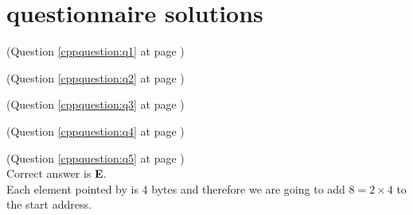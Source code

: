 \chapter{\CC questionnaire solutions}

\begin{cppanswer}
    \label{cppquestion:s1}
    (Question \ref{cppquestion:q1} at page \pageref{cppquestion:q1}) \hfill \\

\end{cppanswer}

\begin{cppanswer}
    \label{cppquestion:s2}
    (Question \ref{cppquestion:q2} at page \pageref{cppquestion:q2}) \hfill \\
    
\end{cppanswer}

\begin{cppanswer}
    \label{cppquestion:s3}
    (Question \ref{cppquestion:q3} at page \pageref{cppquestion:q3}) \hfill \\

\end{cppanswer}

\begin{cppanswer}
    \label{cppquestion:s4}
    (Question \ref{cppquestion:q4} at page \pageref{cppquestion:q4}) \hfill \\

\end{cppanswer}

\begin{cppanswer}
    \label{cppquestion:s5}
    (Question \ref{cppquestion:q5} at page \pageref{cppquestion:q5}) \hfill \\
    Correct answer is \textbf{E}. \\
    Each element pointed by  is $4$ bytes and therefore we are going to add $8=2\times 4$ to the start address.

\end{cppanswer}